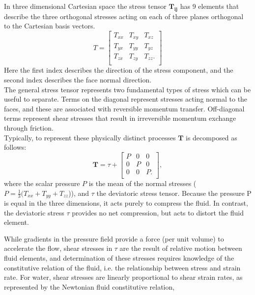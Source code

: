 In three dimensional Cartesian space the stress tensor $\boldsymbol{T_{ij}}$ has 9 elements that describe the three orthogonal stresses acting on each of three planes orthogonal to the Cartesian basis vectors. 
\begin{equation}
T = 
\begin{bmatrix}
T_{xx}&T_{xy}&T_{xz}\\
T_{yx}&T_{yy}&T_{yz}\\
T_{zx}&T_{zy}&T_{zz}.\\
\end{bmatrix}
\end{equation}
Here the first index describes the direction of the stress component, and the second index describes the face normal direction.\\

The general stress tensor represents two fundamental types of stress which can be useful to separate. Terms on the diagonal represent stresses acting normal to the faces, and these are associated with reversible momentum transfer. Off-diagonal terms represent shear stresses that result in irreversible momentum exchange through friction.\\

Typically, to represent these physically distinct processes $\boldsymbol{T}$ is decomposed as follows:
\begin{equation}
    \boldsymbol{T} = \tau + 
    \begin{bmatrix}
P&0&0\\
0&P&0\\
0&0&P.\\
\end{bmatrix},
    \label{L19:StressDecomposition}
\end{equation}
where the scalar pressure $P$ is the mean of the normal stresses ($P = \frac{1}{3}(T_{xx} + T_{yy} + T_{zz}$)), and $\tau$ the deviatoric stress tensor. Because the pressure P is equal in the three dimensions, it acts purely to compress the fluid. In contrast, the deviatoric stress $\tau$ provides no net compression, but acts to distort the fluid element. 

While gradients in the pressure field provide a force (per unit volume) to accelerate the flow, shear stresses in $\tau$ are the result of relative motion between fluid elements, and determination of these stresses requires knowledge of the constitutive relation of the fluid, i.e. the relationship between stress and strain rate. For water, shear stresses are linearly proportional to shear strain rates, as represented by the Newtonian fluid constitutive relation,

